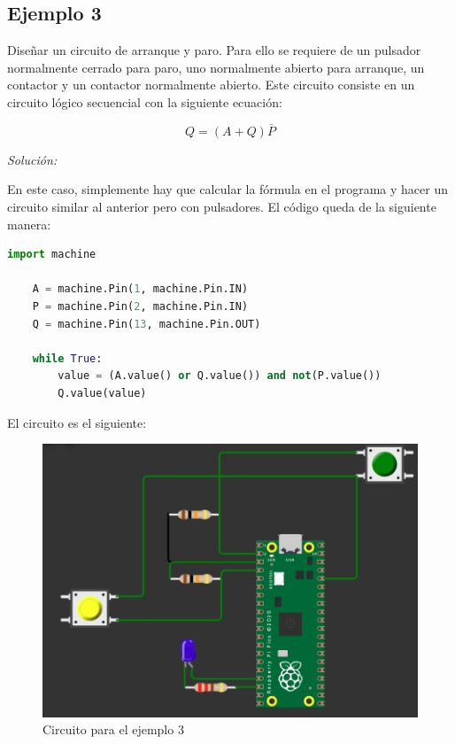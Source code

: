 \documentclass{article}
\begin{document}
    \subsection{Ejemplo 3}

    Diseñar un circuito de arranque y paro. Para ello se requiere de un pulsador normalmente cerrado para paro, uno normalmente abierto para arranque, un contactor y un contactor normalmente abierto. Este circuito consiste en un circuito lógico secuencial con la siguiente ecuación:

    $$
    Q = (A + Q)\bar{P}
    $$

    \bigbreak

    \textit{Solución:}

    \bigbreak

    En este caso, simplemente hay que calcular la fórmula en el programa y hacer un circuito similar al anterior pero con pulsadores. El código queda de la siguiente manera:

    \bigbreak

    \begin{lstlisting}[language=Python, caption={Programa para el ejemplo 3}]
    import machine

    A = machine.Pin(1, machine.Pin.IN)
    P = machine.Pin(2, machine.Pin.IN)
    Q = machine.Pin(13, machine.Pin.OUT)

    while True:
        value = (A.value() or Q.value()) and not(P.value())
        Q.value(value)
    \end{lstlisting}

    El circuito es el siguiente:

    \begin{figure}[H]
        \centering
        \includegraphics[width=0.5\paperwidth]{images/wokwi-example-3-circuit}
        \caption{Circuito para el ejemplo 3}
    \end{figure}
\end{document}
